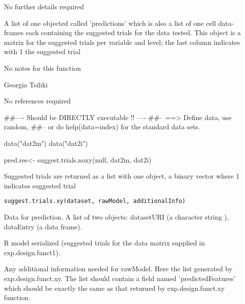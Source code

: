 \documentclass[letterpaper]{book}
\begin{document}
%
\begin{Details}\relax
 No further details required 
\end{Details}
%
\begin{Value}
A list of one objected called 'predictions' which is also a list of one cell data-frames each containing the suggested trials for the data tested. This object is a matrix for the suggested trials per variable and level; the last column indicates with 1 the suggested trial
\end{Value}
%
\begin{Note}\relax
 No notes for this function 
\end{Note}
%
\begin{Author}\relax
Georgia Tsiliki
\end{Author}
%
\begin{References}\relax
 No references required 
\end{References}
%
\begin{Examples}
\begin{ExampleCode}
##---- Should be DIRECTLY executable !! ----
##-- ==>  Define data, use random,
##--	or do  help(data=index)  for the standard data sets.


data("dat2m")
data("dat2i")

pred.res<- suggest.trials.noxy(null, dat2m, dat2i) 

\end{ExampleCode}
\end{Examples}
%
\begin{Description}\relax
Suggested trials are returned as a list with one object, a binary vector where 1 indicates suggested trial
\end{Description}
%
\begin{Usage}
\begin{verbatim}
suggest.trials.xy(dataset, rawModel, additionalInfo)
\end{verbatim}
\end{Usage}
%
\begin{Arguments}
\begin{ldescription}
\item[\code{dataset}]  Data for prediction. A list of two objects: datasetURI (a character string ), dataEntry (a data frame).
\item[\code{rawModel}]  R model serialized (suggested trials for the data matrix supplied in exp.design.funct1). 

\item[\code{additionalInfo}]  Any additional information needed for rawModel. Here the list generated by exp.design.funct.xy. The list should contain a field named 'predictedFeatures' which should be exactly the same as that returned by exp.design.funct.xy function. 

\end{ldescription}
\end{Arguments}
\end{document}
